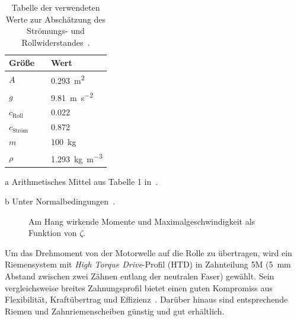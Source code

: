 		\begin{table}[h]
			\caption[Tabelle der verwendeten Werte zur Abschätzung des Strömungs- und Rollwiderstandes]{Tabelle der verwendeten Werte zur Abschätzung des Strömungs- und Rollwiderstandes~\cites{GESTIS.Luft}{material.advances.skateboarding.WATERMAN1978}{air.drag.human.body.VANINGENSCHENAU1982}.}%
			\label{tab:drag roll values}
			\centering
			\begin{threeparttable}
				\begin{tabular}{lp{2cm}l}
					\toprule
					Größe								&& Wert\\ \midrule
					\(A\)\tnote{a}						&& \qty{0,293}{\metre\squared}\\
					\(g\)								&& \qty{9,81}{\metre\per\second\squared}\\
					\(c_\text{Roll}\)					&& \num{0,022}\\
					\(c_\text{Ström}\)\tnote{a}			&& \num{0,872}\\
					\(m\)								&& \qty{100}{\kilo\gram}\\
					\(\rho\)\tnote{b}					&& \qty{1,293}{\kilo\gram\per\metre\cubed}\\ \bottomrule
				\end{tabular}
				\begin{tablenotes}\footnotesize
					\item[a]	Arithmetisches Mittel aus Tabelle 1 in~\cite{air.drag.human.body.VANINGENSCHENAU1982}.
					\item[b]	Unter Normalbedingungen~\cite{GESTIS.Luft}.
				\end{tablenotes}
			\end{threeparttable}
		\end{table}
		\begin{figure}[h]
			\centering
			
			\caption[Am Hang wirkende Momente und Maximalgeschwindigkeit als Funktion von \(\zeta\)]{Am Hang wirkende Momente und Maximalgeschwindigkeit als Funktion von \(\zeta\).}%
			\label{fig:torque ratio and vmax vs zetas}
		\end{figure}\par\medskip
		Um das Drehmoment von der Motorwelle auf die Rolle zu übertragen, wird ein Riemensystem mit \textit{High Torque Drive}-Profil (HTD) in Zahnteilung 5M (\qty{5}{mm} Abstand zwischen zwei Zähnen entlang der neutralen Faser) gewählt. 
		Sein vergleichsweise breites Zahnungsprofil bietet einen guten Kompromiss aus Flexibilität, Kraftübertrag und Effizienz~\cite{gates.catalogue.2021}.
		Darüber hinaus sind entsprechende Riemen und Zahnriemenscheiben günstig und gut erhältlich.
		
